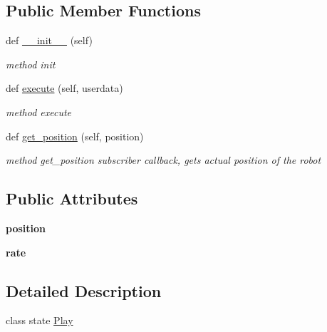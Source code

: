 \subsection*{Public Member Functions}
\begin{DoxyCompactItemize}
\item 
def \hyperlink{classbehaviour__controller_1_1Play_a90fdc5f3993b7d5f4a65effec6a38965}{\+\_\+\+\_\+init\+\_\+\+\_\+} (self)
\begin{DoxyCompactList}\small\item\em method init \end{DoxyCompactList}\item 
def \hyperlink{classbehaviour__controller_1_1Play_af9a8184754ae235cf9a065392c0a8227}{execute} (self, userdata)
\begin{DoxyCompactList}\small\item\em method execute \end{DoxyCompactList}\item 
\mbox{\label{classbehaviour__controller_1_1Play_a2f5b362cda5f127257507b259387d14c}} 
def \hyperlink{classbehaviour__controller_1_1Play_a2f5b362cda5f127257507b259387d14c}{get\+\_\+position} (self, position)
\begin{DoxyCompactList}\small\item\em method get\+\_\+position subscriber callback, gets actual position of the robot \end{DoxyCompactList}\end{DoxyCompactItemize}
\subsection*{Public Attributes}
\begin{DoxyCompactItemize}
\item 
\mbox{\label{classbehaviour__controller_1_1Play_af5b837d4d0897f22ab4c3c2d1c889539}} 
{\bfseries position}
\item 
\mbox{\label{classbehaviour__controller_1_1Play_aeefa0f6436617de2c6ffb6cfb18f329e}} 
{\bfseries rate}
\end{DoxyCompactItemize}


\subsection{Detailed Description}
class state \hyperlink{classbehaviour__controller_1_1Play}{Play} 

